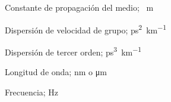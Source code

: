\begin{description}[
  style=standard,      %
  font=\normalfont,    %
  labelwidth=\symbwidth,
  labelsep=1em,
  leftmargin=!,
  itemsep=2pt
]
\item[$\beta$] Constante de propagación del medio; \si{\per\metre}
\item[$\beta_{2}$] Dispersión de velocidad de grupo; \si{\pico\second\squared\per\kilo\metre}
\item[$\beta_{3}$] Dispersión de tercer orden; \si{\pico\second\cubed\per\kilo\metre}
\item[$\lambda$] Longitud de onda; \si{\nano\metre} o \si{\micro\metre}
\item[$\nu$] Frecuencia; \si{\hertz}

\end{description}

\chapterend